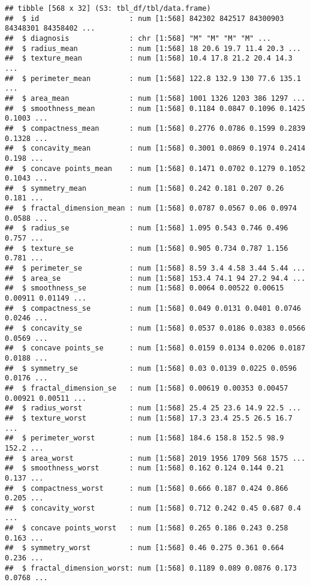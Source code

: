 \documentclass[
]{article}
\begin{document}
\begin{verbatim}
## tibble [568 x 32] (S3: tbl_df/tbl/data.frame)
##  $ id                     : num [1:568] 842302 842517 84300903 84348301 84358402 ...
##  $ diagnosis              : chr [1:568] "M" "M" "M" "M" ...
##  $ radius_mean            : num [1:568] 18 20.6 19.7 11.4 20.3 ...
##  $ texture_mean           : num [1:568] 10.4 17.8 21.2 20.4 14.3 ...
##  $ perimeter_mean         : num [1:568] 122.8 132.9 130 77.6 135.1 ...
##  $ area_mean              : num [1:568] 1001 1326 1203 386 1297 ...
##  $ smoothness_mean        : num [1:568] 0.1184 0.0847 0.1096 0.1425 0.1003 ...
##  $ compactness_mean       : num [1:568] 0.2776 0.0786 0.1599 0.2839 0.1328 ...
##  $ concavity_mean         : num [1:568] 0.3001 0.0869 0.1974 0.2414 0.198 ...
##  $ concave points_mean    : num [1:568] 0.1471 0.0702 0.1279 0.1052 0.1043 ...
##  $ symmetry_mean          : num [1:568] 0.242 0.181 0.207 0.26 0.181 ...
##  $ fractal_dimension_mean : num [1:568] 0.0787 0.0567 0.06 0.0974 0.0588 ...
##  $ radius_se              : num [1:568] 1.095 0.543 0.746 0.496 0.757 ...
##  $ texture_se             : num [1:568] 0.905 0.734 0.787 1.156 0.781 ...
##  $ perimeter_se           : num [1:568] 8.59 3.4 4.58 3.44 5.44 ...
##  $ area_se                : num [1:568] 153.4 74.1 94 27.2 94.4 ...
##  $ smoothness_se          : num [1:568] 0.0064 0.00522 0.00615 0.00911 0.01149 ...
##  $ compactness_se         : num [1:568] 0.049 0.0131 0.0401 0.0746 0.0246 ...
##  $ concavity_se           : num [1:568] 0.0537 0.0186 0.0383 0.0566 0.0569 ...
##  $ concave points_se      : num [1:568] 0.0159 0.0134 0.0206 0.0187 0.0188 ...
##  $ symmetry_se            : num [1:568] 0.03 0.0139 0.0225 0.0596 0.0176 ...
##  $ fractal_dimension_se   : num [1:568] 0.00619 0.00353 0.00457 0.00921 0.00511 ...
##  $ radius_worst           : num [1:568] 25.4 25 23.6 14.9 22.5 ...
##  $ texture_worst          : num [1:568] 17.3 23.4 25.5 26.5 16.7 ...
##  $ perimeter_worst        : num [1:568] 184.6 158.8 152.5 98.9 152.2 ...
##  $ area_worst             : num [1:568] 2019 1956 1709 568 1575 ...
##  $ smoothness_worst       : num [1:568] 0.162 0.124 0.144 0.21 0.137 ...
##  $ compactness_worst      : num [1:568] 0.666 0.187 0.424 0.866 0.205 ...
##  $ concavity_worst        : num [1:568] 0.712 0.242 0.45 0.687 0.4 ...
##  $ concave points_worst   : num [1:568] 0.265 0.186 0.243 0.258 0.163 ...
##  $ symmetry_worst         : num [1:568] 0.46 0.275 0.361 0.664 0.236 ...
##  $ fractal_dimension_worst: num [1:568] 0.1189 0.089 0.0876 0.173 0.0768 ...
\end{verbatim}
\end{document}
